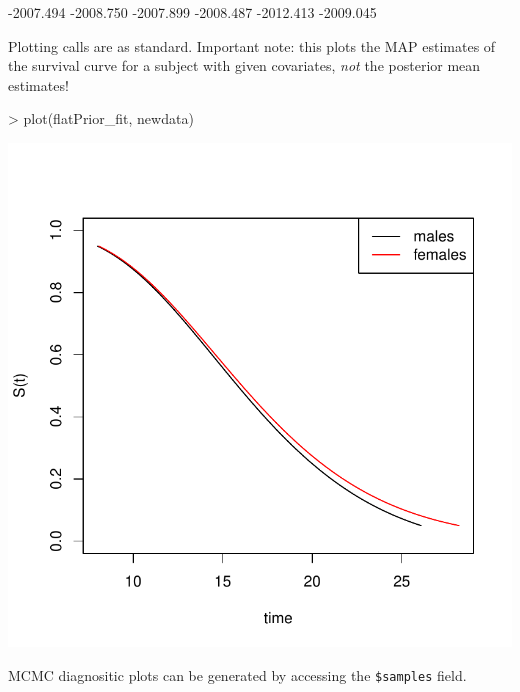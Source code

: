 \documentclass[a4paper]{article}
\begin{document}
\begin{Schunk}
\begin{Soutput}
[1] -2007.494 -2008.750 -2007.899 -2008.487 -2012.413 -2009.045
\end{Soutput}
\end{Schunk}


Plotting calls are as standard. Important note: this plots the MAP estimates of the survival curve for a subject with given covariates, \emph{not} the posterior mean estimates!

\begin{Schunk}
\begin{Sinput}
>   plot(flatPrior_fit, newdata)
\end{Sinput}
\end{Schunk}
\includegraphics{icenReg-017}

MCMC diagnositic plots can be generated by accessing the \texttt{\$samples} field. 
\end{document}

